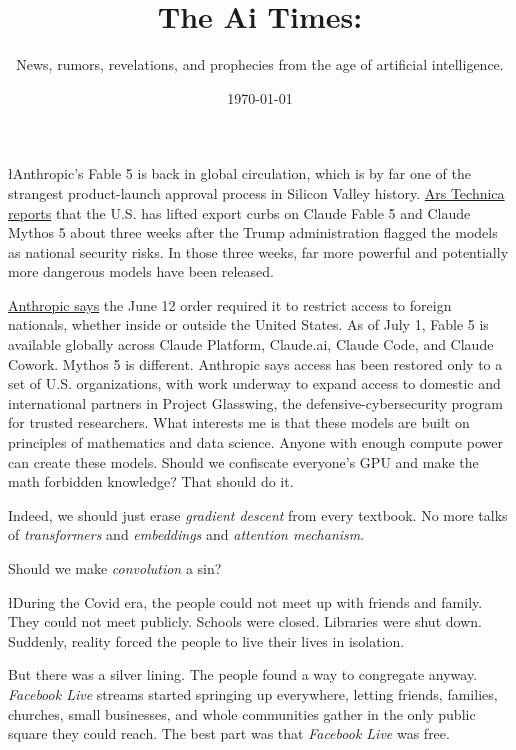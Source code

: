 \documentclass{news}
\title    {The Ai Times:}
\subtitle {News, rumors, revelations, and prophecies from the age of artificial intelligence.}
\date     {\today}
\begin{document}

{\l{A}nthropic's Fable 5 is back in global circulation, which is by far one of the strangest product-launch approval process in Silicon Valley history. \href{https://arstechnica.com/tech-policy/2026/07/after-spooking-trump-into-safety-testing-anthropic-ai-models-get-global-release/}{Ars Technica reports} that the U.S. has lifted export curbs on Claude Fable 5 and Claude Mythos 5 about three weeks after the Trump administration flagged the models as national security risks. In those three weeks, far more powerful and potentially more dangerous models have been released. 
\par}

\href{https://www.anthropic.com/news/redeploying-fable-5}{Anthropic says} the June 12 order required it to restrict access to foreign nationals, whether inside or outside the United States. As of July 1, Fable 5 is available globally across Claude Platform, Claude.ai, Claude Code, and Claude Cowork. Mythos 5 is different. Anthropic says access has been restored only to a set of U.S. organizations, with work underway to expand access to domestic and international partners in Project Glasswing, the defensive-cybersecurity program for trusted researchers. What interests me is that these models are built on principles of mathematics and data science. Anyone with enough compute power can create these models. Should we confiscate everyone's GPU and make the math forbidden knowledge? That should do it.

Indeed, we should just erase \emph{gradient descent} from every textbook. No more talks of \emph{transformers} and \emph{embeddings} and \emph{attention mechanism}. 

Should we make \emph{convolution} a sin?

{\l{D}uring the Covid era, the people could not meet up with friends and family. They could not meet publicly. Schools were closed. Libraries were shut down. Suddenly, reality forced the people to live their lives in isolation.
\par}

But there was a silver lining. The people found a way to congregate anyway. \emph{Facebook Live} streams started springing up everywhere, letting friends, families, churches, small businesses, and whole communities gather in the only public square they could reach. The best part was that \emph{Facebook Live} was free.
\end{document}
